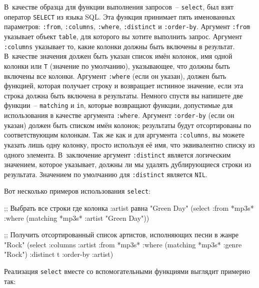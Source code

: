 В~качестве образца для функции выполнения запросов~-- \lstinline{select}, был взят оператор
\lstinline{SELECT} из языка SQL. Эта функция принимает пять именованных параметров:
\lstinline{:from}, \lstinline{:columns}, \lstinline{:where}, \lstinline{:distinct} и \lstinline{:order-by}.
Аргумент \lstinline{:from} указывает объект \lstinline{table}, для которого вы хотите выполнить
запрос.  Аргумент \lstinline{:columns} указывает то, какие колонки должны быть включены в
результат.  В~качестве значения должен быть указан список имён колонок, имя одной колонки
или \lstinline{T} (значение по умолчанию), указывающее, что должны быть включены все колонки.
Аргумент \lstinline{:where} (если он указан), должен быть функцией, которая получает строку и
возвращает истинное значение, если эта строка должна быть включена в результаты.  Немного
спустя вы напишете две функции~-- \lstinline{matching} и \lstinline{in}, которые возвращают
функции, допустимые для использования в качестве аргумента \lstinline{:where}.  Аргумент
\lstinline{:order-by} (если он указан) должен быть списком имён колонок; результаты будут
отсортированы по соответствующим колонкам.  Так же как и для аргумента \lstinline{:columns}, вы
можете указать лишь одну колонку, просто используя её имя, что эквивалентно списку из
одного элемента.  В~заключение аргумент \lstinline{:distinct} является логическим значением,
которое указывает, должны ли мы удалять дублирующиеся строки из результата.  Значением
по умолчанию для \lstinline{:distinct} является \lstinline{NIL}.

Вот несколько примеров использования \lstinline{select}:

\begin{myverb}
;; Выбрать все строки где колонка :artist равна "Green Day"
(select :from *mp3s* :where (matching *mp3s* :artist "Green Day"))

;; Получить отсортированный список артистов, исполняющих песни в жанре "Rock"
(select
  :columns :artist
  :from *mp3s*
  :where (matching *mp3s* :genre "Rock")
  :distinct t
  :order-by :artist)
\end{myverb}

Реализация \lstinline{select} вместе со вспомогательными функциями выглядит примерно так:

